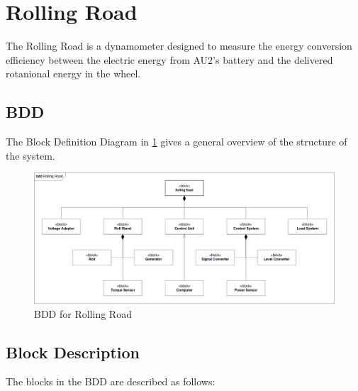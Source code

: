 \section{Rolling Road}
The Rolling Road is a dynamometer designed to measure the energy conversion efficiency  between the electric energy from AU2's battery and the delivered rotanional energy in the wheel.

\subsection{BDD}
The Block Definition Diagram in \ref{fig:RR_BDD} gives a general overview of the structure of the system.


\begin{figure}[H]
	\centering
	\includegraphics[width=0.9\linewidth]{Architecture/BDD_RollingRoad}
	\caption{BDD for Rolling Road}
	\label{fig:RR_BDD}
\end{figure}

\subsection{Block Description}
The blocks in the BDD are described as follows:

